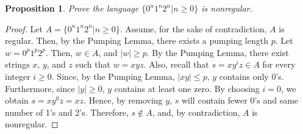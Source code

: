 \documentclass{article}
\newtheorem{proposition}{Proposition}
\begin{document}
\begin{proposition}
Prove the language $\{0^n1^n2^n|n\ge0\}$ is nonregular.
\end{proposition}

\begin{proof}
Let $A=\{0^n1^n2^n|n\ge0\}$. Assume, for the sake of contradiction, $A$ is regular.
Then, by the Pumping Lemma, there exists a pumping length $p$. Let $w=0^p1^p2^p$. Then,
$w \in A$, and $|w| \ge p$. By the Pumping Lemma, there exist strings $x$, $y$, and $z$
such that $w=xyz$. Also, recall that $s=xy^iz \in A$ for every integer $i \ge 0$.
Since, by the Pumping Lemma, $|xy| \le p$, $y$ contains only 0's. Furthermore,
since $|y| \ge 0$, $y$ contains at least one zero. By choosing $i=0$, we obtain
$s=xy^0z=xz$. Hence, by removing $y$, $s$ will contain fewer 0's and same number
of 1's and 2's. Therefore, $s \notin A$, and, by contradiction, $A$ is nonregular.
\end{proof}
\end{document}
